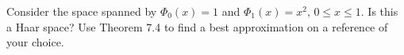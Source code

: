 \begin{problem}
  Consider the space spanned by $\Phi_0(x) = 1$ and
  $\Phi_1(x) = x^2 ,\, 0 \leq x ≤ 1$. Is this a Haar space? Use
  Theorem 7.4 to find a best approximation on a reference of your
  choice.
\end{problem}


\begin{solution}

\end{solution}
